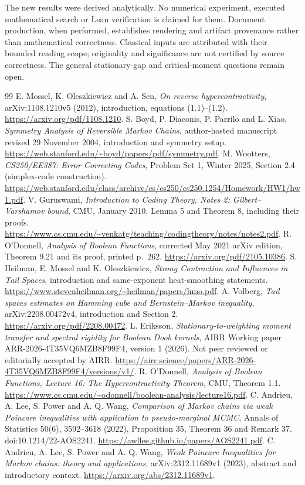\documentclass[11pt]{article}
\begin{document}
The new results were derived analytically. No numerical experiment, executed mathematical search or Lean verification is claimed for them. Document production, when performed, establishes rendering and artifact provenance rather than mathematical correctness. Classical inputs are attributed with their bounded reading scope; originality and significance are not certified by source correctness. The general stationary-gap and critical-moment questions remain open.
\begin{thebibliography}{99}
 E. Mossel, K. Oleszkiewicz and A. Sen, \emph{On reverse hypercontractivity}, arXiv:1108.1210v5 (2012), introduction, equations (1.1)--(1.2). \url{https://arxiv.org/pdf/1108.1210}.
 S. Boyd, P. Diaconis, P. Parrilo and L. Xiao, \emph{Symmetry Analysis of Reversible Markov Chains}, author-hosted manuscript revised 29 November 2004, introduction and symmetry setup. \url{https://web.stanford.edu/~boyd/papers/pdf/symmetry.pdf}.
 M. Wootters, \emph{CS250/EE387: Error Correcting Codes}, Problem Set 1, Winter 2025, Section 2.4 (simplex-code construction). \url{https://web.stanford.edu/class/archive/cs/cs250/cs250.1254/Homework/HW1/hw1.pdf}.
 V. Guruswami, \emph{Introduction to Coding Theory, Notes 2: Gilbert--Varshamov bound}, CMU, January 2010, Lemma 5 and Theorem 8, including their proofs. \url{https://www.cs.cmu.edu/~venkatg/teaching/codingtheory/notes/notes2.pdf}.
 R. O'Donnell, \emph{Analysis of Boolean Functions}, corrected May 2021 arXiv edition, Theorem 9.21 and its proof, printed p.~262. \url{https://arxiv.org/pdf/2105.10386}.
 S. Heilman, E. Mossel and K. Oleszkiewicz, \emph{Strong Contraction and Influences in Tail Spaces}, introduction and same-exponent heat-smoothing statements. \url{https://www.stevenheilman.org/~heilman/papers/hmo.pdf}.
 A. Volberg, \emph{Tail spaces estimates on Hamming cube and Bernstein--Markov inequality}, arXiv:2208.00472v4, introduction and Section 2. \url{https://arxiv.org/pdf/2208.00472}.
 L. Eriksson, \emph{Stationary-to-weighting moment transfer and spectral rigidity for Boolean Doob kernels}, AIRR Working paper ARR-2026-4T35VQ6MZB8F99F4, version 1 (2026). Not peer reviewed or editorially accepted by AIRR. \url{https://airr.science/papers/ARR-2026-4T35VQ6MZB8F99F4/versions/v1/}.
 R. O'Donnell, \emph{Analysis of Boolean Functions, Lecture 16: The Hypercontractivity Theorem}, CMU, Theorem 1.1. \url{https://www.cs.cmu.edu/~odonnell/boolean-analysis/lecture16.pdf}.
 C. Andrieu, A. Lee, S. Power and A. Q. Wang, \emph{Comparison of Markov chains via weak Poincare inequalities with application to pseudo-marginal MCMC}, Annals of Statistics 50(6), 3592--3618 (2022), Proposition 35, Theorem 36 and Remark 37. doi:10.1214/22-AOS2241. \url{https://awllee.github.io/papers/AOS2241.pdf}.
 C. Andrieu, A. Lee, S. Power and A. Q. Wang, \emph{Weak Poincare Inequalities for Markov chains: theory and applications}, arXiv:2312.11689v1 (2023), abstract and introductory context. \url{https://arxiv.org/abs/2312.11689v1}.
\end{thebibliography}
\end{document}
